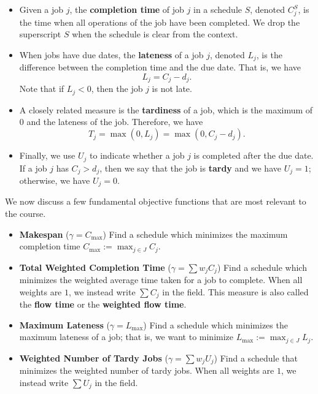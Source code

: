 \begin{itemize}

    \item Given a job $j$, the {\bf completion time} of job $j$ in a schedule 
    $S$, denoted $C_j^S$, is the time when all operations of the job have 
    been completed. We drop the superscript $S$ when the schedule is clear 
    from the context.

    \item When jobs have due dates, the {\bf lateness} of a job $j$, 
    denoted $L_j$, is the difference between the completion time and the 
    due date. That is, we have 
    \[ L_j = C_j - d_j. \] 
    Note that if $L_j < 0$, then the job $j$ is not late. 

    \item A closely related measure is the {\bf tardiness} of a job, 
    which is the maximum of $0$ and the lateness of the job. Therefore, 
    we have 
    \[ T_j = \max(0, L_j) = \max(0, C_j - d_j). \] 
    
    \item Finally, we use $U_j$ to indicate whether a job $j$ is completed 
    after the due date. If a job $j$ has $C_j > d_j$, then we say that 
    the job is {\bf tardy} and we have $U_j = 1$; otherwise, we have $U_j = 0$. 

\end{itemize}  

We now discuss a few fundamental objective functions that are most relevant 
to the course.

\begin{itemize}

    \item {\bf Makespan} ($\gamma = C_{\max}$) Find a schedule which minimizes 
    the maximum completion time $C_{\max} := \max_{j\in J} C_j$.

    \item {\bf Total Weighted Completion Time} ($\gamma = \sum w_j C_j$)
    Find a schedule which minimizes the weighted average time taken for a 
    job to complete. When all weights are $1$, we instead write 
    $\sum C_j$ in the field. This measure is also called the {\bf flow time}
    or the {\bf weighted flow time}.

    \item {\bf Maximum Lateness} ($\gamma = L_{\max}$) Find a schedule 
    which minimizes the maximum lateness of a job; that is, we want to 
    minimize $L_{\max} := \max_{j\in J} L_j$. 

    \item {\bf Weighted Number of Tardy Jobs} ($\gamma = \sum w_j U_j$)
    Find a schedule that minimizes the weighted number of tardy jobs.
    When all weights are $1$, we instead write $\sum U_j$ in the field. 

\end{itemize}

